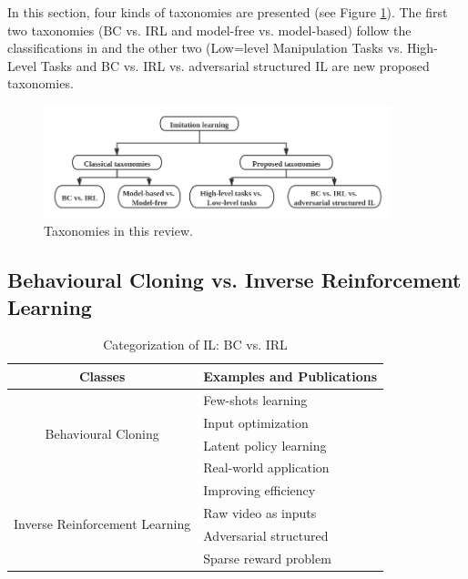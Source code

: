 \documentclass[acmsmall]{acmart}
\begin{document}
In this section, four kinds of taxonomies are presented (see Figure \ref{fig_tax}). The first two taxonomies (BC vs. IRL and model-free vs. model-based) follow the classifications in\cite{osaAlgorithmicPerspectiveImitation2018,torabirecent2019} and the other two (Low=level Manipulation Tasks vs. High-Level Tasks and BC vs. IRL vs. adversarial structured IL are new proposed taxonomies. 
\begin{figure}[t]
      \centering
      \includegraphics[width=0.9\textwidth]{tax_new.png}
      \caption{Taxonomies in this review.}
      \label{fig_tax}
\end{figure}


\subsection{Behavioural Cloning vs. Inverse Reinforcement Learning} 

\begin{table}[t]
\caption{Categorization of IL: BC vs. IRL}
\label{table_bc_irl}
\centering
\begin{tabular}{@{}cl@{}}
\toprule
Classes & Examples and Publications\\ \midrule
\multirow{4}{*}{Behavioural Cloning} & Few-shots learning\cite{duanOneShotImitationLearning2017} \\ \cmidrule(l){2-2} 
 & Input optimization\cite{chenLearningCheating2019} \\ \cmidrule(l){2-2} 
 & Latent policy learning\cite{lynchLearningLatentPlans2019} \\ \cmidrule(l){2-2} 
 & Real-world application\cite{zhangDeepImitationLearning2018} \\ \midrule
\multirow{4}{*}{Inverse Reinforcement Learning} & Improving efficiency\cite{brownExtrapolatingSuboptimalDemonstrations2019} \\ \cmidrule(l){2-2} 
 & Raw video as inputs\cite{sermanetTimeContrastiveNetworksSelfSupervised2018} \\ \cmidrule(l){2-2} 
 & Adversarial structured\cite{sunProvablyEfficientImitation2019} \\ \cmidrule(l){2-2} 
 & Sparse reward problem\cite{nairOvercomingExplorationReinforcement2018} \\ \bottomrule
\end{tabular}
\end{table}
\end{document}
